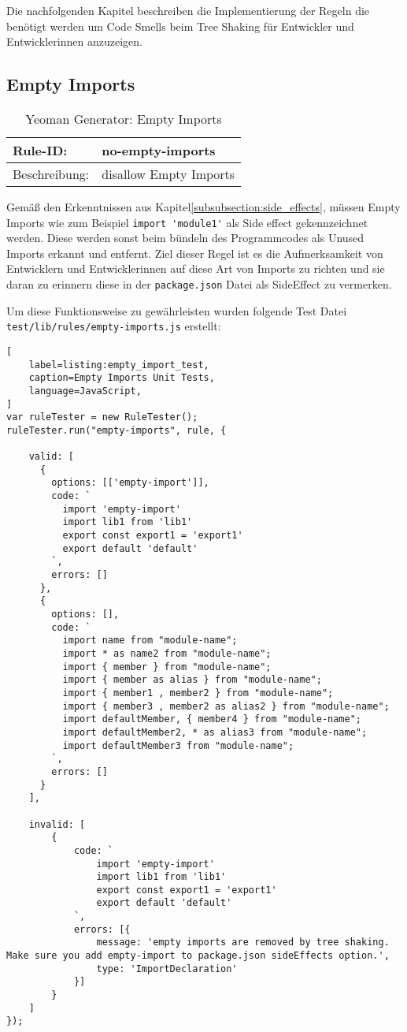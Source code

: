Die nachfolgenden Kapitel beschreiben die Implementierung der Regeln die benötigt werden um Code Smells beim Tree Shaking für Entwickler und Entwicklerinnen anzuzeigen.

\subsection{Empty Imports}

\begin{table}[h]
\centering
\caption{Yeoman Generator: Empty Imports}
\label{tbl:empty_imports}
\begin{tabular}{|l|l|}
\hline
Rule-ID: & no-empty-imports \\ \hline
Beschreibung: & disallow Empty Imports \\ \hline
\end{tabular}
\end{table}

Gemäß den Erkenntnissen aus  Kapitel\ref{subsubsection:side_effects}, müssen Empty Imports wie zum Beispiel \lstinline{import 'module1'} als Side effect gekennzeichnet werden. Diese werden sonst beim bündeln des Programmcodes als Unused Imports erkannt und entfernt. Ziel dieser Regel ist es die Aufmerksamkeit von Entwicklern und Entwicklerinnen auf diese Art von Imports zu richten und sie daran zu erinnern diese in der  \lstinline{package.json} Datei als SideEffect zu vermerken.

Um diese Funktionsweise zu gewährleisten wurden folgende Test Datei \lstinline{test/lib/rules/empty-imports.js} erstellt: 

\begin{lstlisting}[
    label=listing:empty_import_test,
	caption=Empty Imports Unit Tests,
	language=JavaScript,
]
var ruleTester = new RuleTester();
ruleTester.run("empty-imports", rule, {

    valid: [
      {
        options: [['empty-import']],
        code: `
          import 'empty-import'
          import lib1 from 'lib1'
          export const export1 = 'export1'
          export default 'default'
        `,
        errors: []
      },
      {
        options: [],
        code: `
          import name from "module-name";
          import * as name2 from "module-name";
          import { member } from "module-name";
          import { member as alias } from "module-name";
          import { member1 , member2 } from "module-name";
          import { member3 , member2 as alias2 } from "module-name";
          import defaultMember, { member4 } from "module-name";
          import defaultMember2, * as alias3 from "module-name";
          import defaultMember3 from "module-name";
        `,
        errors: []
      }
    ],

    invalid: [
        {
            code: `
                import 'empty-import'
                import lib1 from 'lib1'
                export const export1 = 'export1'
                export default 'default'
            `,
            errors: [{
                message: 'empty imports are removed by tree shaking. Make sure you add empty-import to package.json sideEffects option.',
                type: 'ImportDeclaration'
            }]
        }
    ]
});
\end{lstlisting}

